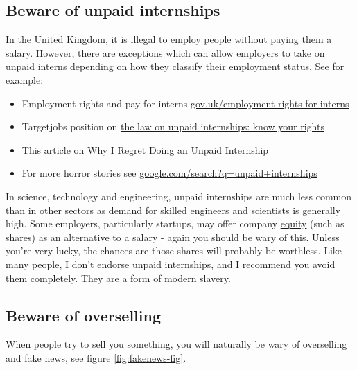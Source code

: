 \documentclass[
]{book}
\providecommand{\tightlist}{%
  \setlength{\itemsep}{0pt}\setlength{\parskip}{0pt}}
\begin{document}
\hypertarget{unpaid}{%
\subsection{Beware of unpaid internships}\label{unpaid}}

In the United Kingdom, it is illegal to employ people without paying them a salary. However, there are exceptions which can allow employers to take on unpaid interns depending on how they classify their employment status. See for example:

\begin{itemize}
\tightlist
\item
  Employment rights and pay for interns \href{https://www.gov.uk/employment-rights-for-interns}{gov.uk/employment-rights-for-interns}
\item
  Targetjobs position on \href{https://targetjobs.co.uk/internships/advice/275017-the-law-on-unpaid-internships-know-your-rights}{the law on unpaid internships: know your rights}
\item
  This article on \href{https://www.ratemyplacement.co.uk/blog/why-i-regret-doing-an-unpaid-internship/}{Why I Regret Doing an Unpaid Internship} \citep{louiseregret}
\item
  For more horror stories see \href{https://www.google.com/search?q=unpaid+internships}{google.com/search?q=unpaid+internships}
\end{itemize}

In science, technology and engineering, unpaid internships are much less common than in other sectors as demand for skilled engineers and scientists is generally high. Some employers, particularly startups, may offer company \href{https://en.wikipedia.org/wiki/Equity_(finance)}{equity} (such as shares) as an alternative to a salary - again you should be wary of this. Unless you're very lucky, the chances are those shares will probably be worthless. Like many people, I don't endorse unpaid internships, and I recommend you avoid them completely. They are a form of modern slavery.

\hypertarget{oversell}{%
\subsection{Beware of overselling}\label{oversell}}

When people try to sell you something, you will naturally be wary of overselling and fake news, see figure \ref{fig:fakenews-fig}.
\end{document}
